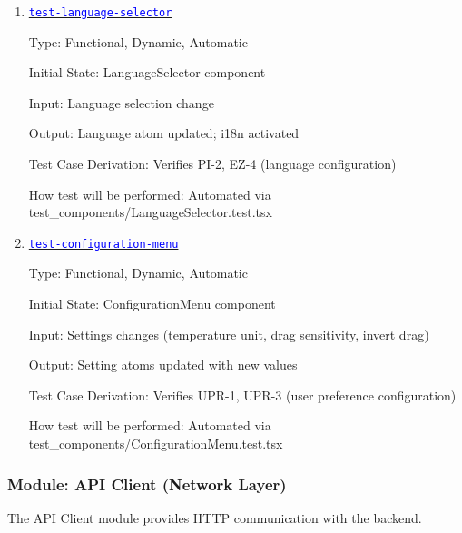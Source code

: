 \documentclass[12pt, titlepage]{article}
\newcommand{\tid}[1]{\hyperlink{tid:#1}{\textcolor{blue}{\texttt{#1}}}}
\begin{document}
\begin{enumerate}

  \item{\tid{test-language-selector}\\}

        Type: Functional, Dynamic, Automatic

        Initial State: LanguageSelector component

        Input: Language selection change

        Output: Language atom updated; i18n activated

        Test Case Derivation: Verifies PI-2, EZ-4 (language configuration)

        How test will be performed: Automated via
        test\_components/LanguageSelector.test.tsx

  \item{\tid{test-configuration-menu}\\}

        Type: Functional, Dynamic, Automatic

        Initial State: ConfigurationMenu component

        Input: Settings changes (temperature unit, drag sensitivity, invert drag)

        Output: Setting atoms updated with new values

        Test Case Derivation: Verifies UPR-1, UPR-3 (user preference configuration)

        How test will be performed: Automated via
        test\_components/ConfigurationMenu.test.tsx

\end{enumerate}

\subsubsection{Module: API Client (Network Layer)}

The API Client module provides HTTP communication with the backend.
\end{document}
